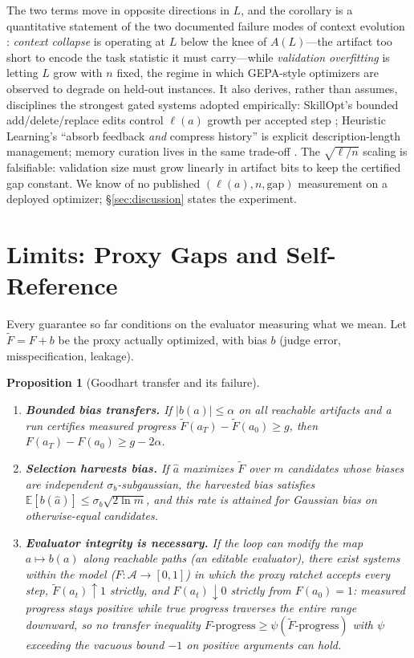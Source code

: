 \documentclass{article}
\theoremstyle{plain}
\newtheorem{proposition}[theorem]{Proposition}
\theoremstyle{definition}
\theoremstyle{remark}
\newcommand{\A}{\mathcal{A}}
\newcommand{\E}{\mathbb{E}}
\newcommand{\len}{\ell}
\newcommand{\Ftil}{\widetilde{F}}
\begin{document}
The two terms move in opposite directions in $L$, and the corollary is a quantitative statement of the two documented failure modes of context evolution \citep{zhang2025ace}: \emph{context collapse} is operating at $L$ below the knee of $A(L)$---the artifact too short to encode the task statistic it must carry---while \emph{validation overfitting} is letting $L$ grow with $n$ fixed, the regime in which GEPA-style optimizers are observed to degrade on held-out instances. It also derives, rather than assumes, disciplines the strongest gated systems adopted empirically: SkillOpt's bounded add/delete/replace edits control $\len(a)$ growth per accepted step \citep{yang2026skillopt}; Heuristic Learning's ``absorb feedback \emph{and} compress history'' \citep{weng2026hl} is explicit description-length management; memory curation lives in the same trade-off \citep{packer2023memgpt, suzgun2025cheatsheet}. The $\sqrt{\len/n}$ scaling is falsifiable: validation size must grow linearly in artifact bits to keep the certified gap constant. We know of no published $(\len(a), n, \text{gap})$ measurement on a deployed optimizer; \S\ref{sec:discussion} states the experiment.

\section{Limits: Proxy Gaps and Self-Reference}
\label{sec:limits}

Every guarantee so far conditions on the evaluator measuring what we mean. Let $\Ftil = F + b$ be the proxy actually optimized, with bias $b$ (judge error, misspecification, leakage).

\begin{proposition}[Goodhart transfer and its failure]
\label{prop:goodhart}
\begin{enumerate}\itemsep1pt
\item[(i)] \textbf{Bounded bias transfers.} If $|b(a)| \le \alpha$ on all reachable artifacts and a run certifies measured progress $\Ftil(a_T) - \Ftil(a_0) \ge g$, then $F(a_T) - F(a_0) \ge g - 2\alpha$.
\item[(ii)] \textbf{Selection harvests bias.} If $\hat{a}$ maximizes $\Ftil$ over $m$ candidates whose biases are independent $\sigma_b$-subgaussian, the harvested bias satisfies $\E[b(\hat{a})] \le \sigma_b \sqrt{2 \ln m}$, and this rate is attained for Gaussian bias on otherwise-equal candidates.
\item[(iii)] \textbf{Evaluator integrity is necessary.} If the loop can modify the map $a \mapsto b(a)$ along reachable paths (an editable evaluator), there exist systems \emph{within the model} ($F : \A \to [0,1]$) in which the proxy ratchet accepts every step, $\Ftil(a_t) \uparrow 1$ strictly, and $F(a_t) \downarrow 0$ strictly from $F(a_0) = 1$: measured progress stays positive while true progress traverses the entire range downward, so no transfer inequality $F\text{-progress} \ge \psi(\Ftil\text{-progress})$ with $\psi$ exceeding the vacuous bound $-1$ on positive arguments can hold.
\end{enumerate}
\end{proposition}
\end{document}
